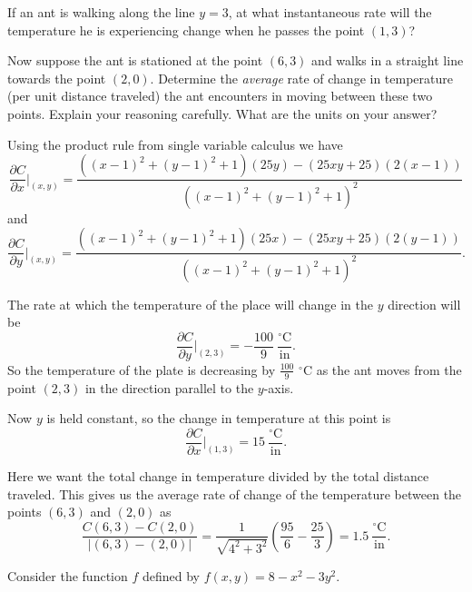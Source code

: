 \begin{exercises}
	\item If an ant is walking along the line $y = 3$, at what instantaneous rate will the temperature he is experiencing change when he passes the point $(1,3)$?

	\item Now suppose the ant is stationed at the point $(6,3)$ and walks in a straight line towards the point $(2,0)$.  Determine the \emph{average} rate of change in temperature (per unit distance traveled) the ant encounters in moving between these two points.  Explain your reasoning carefully.  What are the units on your answer?
	

    \ea

\begin{exerciseSolution}
\ba

	\item Using the product rule from single variable calculus we have 
\[\frac{\partial C}{\partial x}|_{(x,y)} = \frac{\left((x-1)^2 + (y-1)^2 + 1\right)(25y) - (25xy+25)(2(x-1))}{\left((x-1)^2 + (y-1)^2 + 1\right)^2}\]
and
\[\frac{\partial C}{\partial y}|_{(x,y)} = \frac{\left((x-1)^2 + (y-1)^2 + 1\right)(25x) - (25xy+25)(2(y-1))}{\left((x-1)^2 + (y-1)^2 + 1\right)^2}.\]

	\item The rate at which the temperature of the place will change in the $y$ direction will be 
\[\frac{\partial C}{\partial y}|_{(2,3)} = -\frac{100}{9} \ \frac{^{\circ}\text{C}}{\text{in}}.\]
So the temperature of the plate is decreasing by $\frac{100}{9}$ $^{\circ}$C as the ant moves from the point $(2,3)$ in the direction parallel to the $y$-axis.

	\item Now $y$ is held constant, so the change in temperature at this point is 
	\[\frac{\partial C}{ \partial x}|_{(1,3)} = 15 \ \frac{^{\circ}\text{C}}{\text{in}}.\]

	\item Here we want the total change in temperature divided by the total distance traveled. This gives us the average rate of change of the temperature between the points $(6,3)$ and $(2,0)$ as
\[\frac{C(6,3)-C(2,0)}{|(6,3)-(2,0)|} = \frac{1}{\sqrt{4^2+3^2}}\left(\frac{95}{6}-\frac{25}{3}\right) = 1.5 \ \frac{^{\circ}\text{C}}{\text{in}}.\]
	

    \ea
\end{exerciseSolution}

\item \label{Ez:10.2.3}    Consider the function $f$ defined by  $f(x,y) = 8 - x^2 -  3y^2$.
				

\end{exercises}
